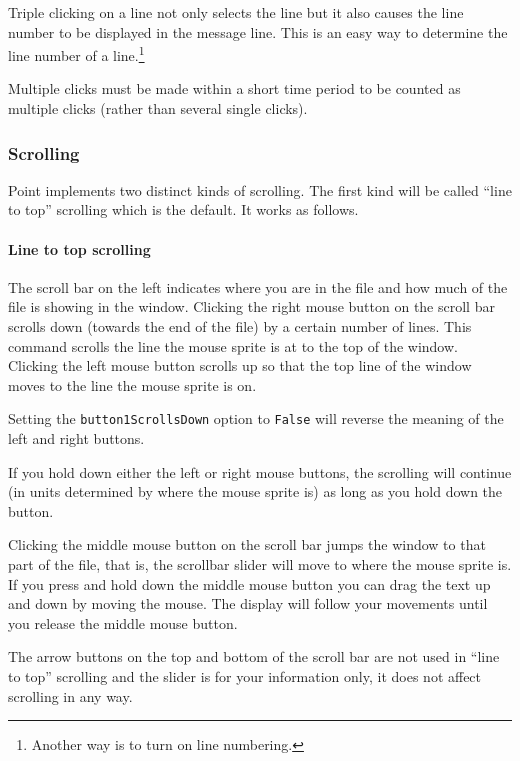 Triple clicking on a line not only selects the line but it also
causes the line number to be displayed in the message line.
This is an easy way to determine the line number of a line.\footnote{
Another way is to turn on line numbering.}

Multiple clicks must be made within a short time period to be counted
as multiple clicks (rather than several single clicks).



\subsubsection{Scrolling}				\label{sect:scrolling}

Point implements two distinct kinds of scrolling.
The first kind will be called ``line to top'' scrolling
which is the default.
It works as follows.

\paragraph{Line to top scrolling}

The scroll bar on the left indicates where you are in the file
and how much of the file is showing in the window.
Clicking the right mouse button on the scroll bar scrolls down
(towards the end of the file) by a certain number of lines.
This command scrolls the line the mouse sprite is at to the top
of the window.
Clicking the left mouse button scrolls up so that the top line of the
window moves to the line the mouse sprite is on.

Setting the {\tt button1ScrollsDown} option to {\tt False} will reverse
the meaning of the left and right buttons.

If you hold down either the left or right mouse buttons,
the scrolling will continue (in units determined by where
the mouse sprite is) as long as you hold down the button.

Clicking the middle mouse button on the scroll bar jumps the
window to that part of the file, that is, the scrollbar slider will
move to where the mouse sprite is.
If you press and hold down the middle mouse button you can
drag the text up and down by moving the mouse.
The display will follow your movements until
you release the middle mouse button.

The arrow buttons on the top and bottom of the scroll bar are not
used in ``line to top'' scrolling and the slider is for your information
only, it does not affect scrolling in any way.

